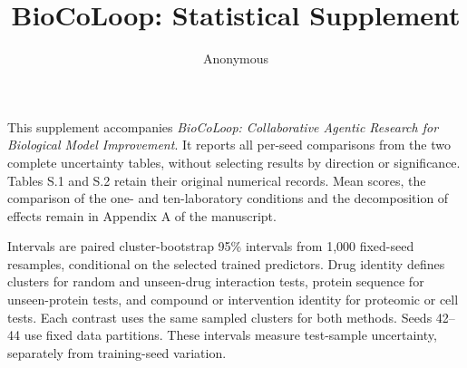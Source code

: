 \documentclass{article}
\begin{document}
\title{BioCoLoop: Statistical Supplement}
\author{Anonymous}
\maketitle
\renewcommand{\thetable}{S.\arabic{table}}
\renewcommand{\theHtable}{S.\arabic{table}}

This supplement accompanies \emph{BioCoLoop: Collaborative Agentic Research for Biological Model Improvement}. It reports all per-seed comparisons from the two complete uncertainty tables, without selecting results by direction or significance. Tables S.1 and S.2 retain their original numerical records. Mean scores, the comparison of the one- and ten-laboratory conditions and the decomposition of effects remain in Appendix A of the manuscript.

Intervals are paired cluster-bootstrap 95\% intervals from 1,000 fixed-seed resamples, conditional on the selected trained predictors. Drug identity defines clusters for random and unseen-drug interaction tests, protein sequence for unseen-protein tests, and compound or intervention identity for proteomic or cell tests. Each contrast uses the same sampled clusters for both methods. Seeds 42--44 use fixed data partitions. These intervals measure test-sample uncertainty, separately from training-seed variation.


\clearpage

\end{document}
